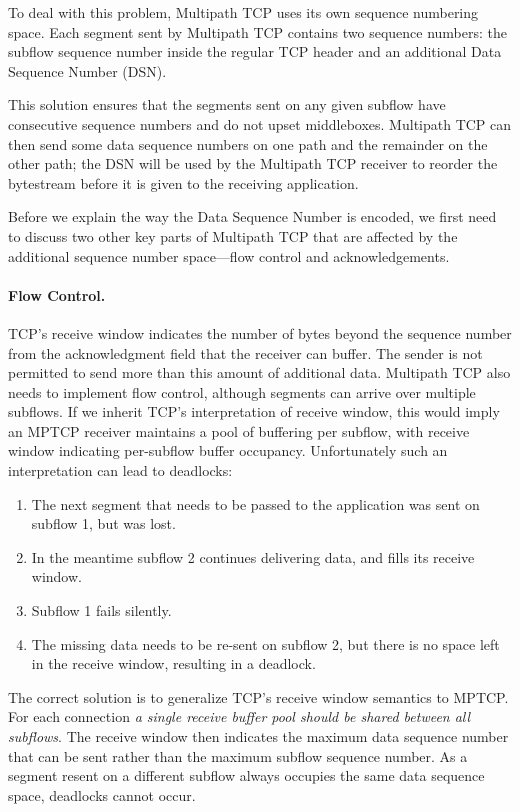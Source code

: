 To deal with this problem, Multipath TCP uses its own sequence
numbering space.  Each segment sent by Multipath TCP contains two
sequence numbers: the subflow sequence number inside the regular TCP
header and an additional Data Sequence Number (DSN). 


This solution ensures that the segments sent on any given
subflow have consecutive sequence numbers and do not upset
middleboxes.  Multipath TCP can then send some data sequence numbers
on one path and the remainder on the other path; the DSN will be used by the Multipath TCP
receiver to reorder the bytestream before it is given to the receiving
application.

Before we explain the way the Data Sequence Number is encoded, we first need to discuss two other
key parts of Multipath TCP  that are affected by the additional sequence number
space---flow control and acknowledgements.

\paragraph{Flow Control.}
TCP's receive window indicates the number of bytes beyond the sequence number from the acknowledgment field that the receiver 
can buffer. The sender is not permitted to send more than this amount of additional data.
Multipath TCP also needs to implement flow control, although segments
can arrive over multiple subflows. If we 
inherit TCP's interpretation of receive window, this would imply an MPTCP receiver maintains a pool of buffering 
per subflow, with receive window indicating per-subflow buffer occupancy. Unfortunately such an interpretation 
can lead to deadlocks:
\begin{enumerate}
\item The next segment that needs to be passed to the application was
  sent on subflow 1, but was lost.
\item In the meantime subflow 2 continues delivering data, and fills
  its receive window.
\item Subflow 1 fails silently.
\item The missing data needs to be re-sent on subflow 2, but there is
  no space left in the receive window, resulting in a deadlock.
\end{enumerate}

The correct solution is to generalize TCP's receive window semantics to MPTCP. For each connection \emph{a 
single receive buffer pool should be shared between all subflows}. The receive window then indicates 
the maximum data sequence number that can be sent rather than the maximum subflow sequence number. As 
a segment resent on a different subflow always occupies the same data sequence space, deadlocks cannot occur.

